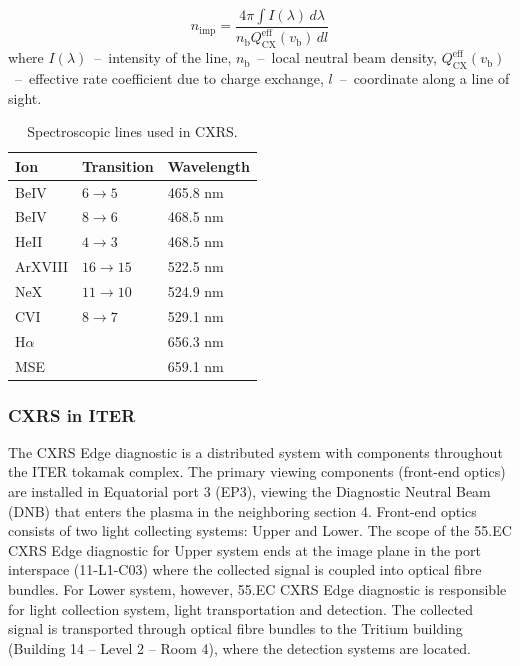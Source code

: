 \documentclass[../main.tex]{subfiles}
\begin{document}
\begin{equation}
    \label{eq:impurity_density}
    n_\text{imp} = \dfrac{4\pi \int I(\lambda)\, d\lambda}{n_\text{b} Q_\text{CX}^\text{eff}(v_\text{b})\, dl}
\end{equation}
where $I(\lambda)$~--~intensity of the line, $n_\text{b}$~--~local neutral beam density, $Q_\text{CX}^\text{eff}(v_\text{b})$~--~effective rate coefficient due to charge exchange, $l$~--~coordinate along a line of sight.

\begin{table}[!ht]
    \caption{Spectroscopic lines used in CXRS.}%
    \label{tab:cxrs_lines}
    \centering
    \begin{tabular}[]{l l l}
        \toprule
        Ion       & Transition & Wavelength \\
        \midrule
        BeIV      & $6\to5$    & 465.8 nm   \\
        BeIV      & $8\to6$    & 468.5 nm   \\
        HeII      & $4\to3$    & 468.5 nm   \\
        \midrule
        ArXVIII   & $16\to15$  & 522.5 nm   \\
        NeX       & $11\to10$  & 524.9 nm   \\
        CVI       & $8\to7$    & 529.1 nm   \\
        \midrule
        H$\alpha$ &            & 656.3 nm   \\
        MSE       &            & 659.1 nm   \\
        \bottomrule
    \end{tabular}
\end{table}

\subsubsection{CXRS in ITER}
The CXRS Edge diagnostic is a distributed system with components throughout the ITER tokamak complex. The primary viewing components (front-end optics) are installed in Equatorial port 3 (EP3), viewing the Diagnostic Neutral Beam (DNB) that enters the plasma in the neighboring section 4.
Front-end optics consists of two light collecting systems: Upper and Lower. The scope of the 55.EC CXRS Edge diagnostic for Upper system ends at the image plane in the port interspace (11-L1-C03) where the collected signal is coupled into optical fibre bundles.
For Lower system, however, 55.EC CXRS Edge diagnostic is responsible for light collection system, light transportation and detection. The collected signal is transported through optical fibre bundles to the Tritium building (Building 14 – Level 2 – Room 4), where the detection systems are located.
\end{document}
